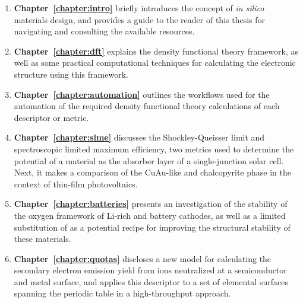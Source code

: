 \begin{enumerate}[]

\vfill
\item \textbf{Chapter~\ref{chapter:intro}} briefly introduces the concept of \textit{in silico} materials design, and provides a guide to the reader of this thesis for navigating and consulting the available resources.

\vfill
\item \textbf{Chapter~\ref{chapter:dft}} explains the density functional theory framework, as well as some practical computational techniques for calculating the electronic structure using this framework.

\vfill
\item \textbf{Chapter~\ref{chapter:automation}} outlines the workflows used for the automation of the required density functional theory calculations of each descriptor or metric.

\vfill
\item \textbf{Chapter~\ref{chapter:slme}} discusses the Shockley-Queisser limit and spectroscopic limited maximum efficiency, two metrics used to determine the potential of a material as the absorber layer of a single-junction solar cell. Next, it makes a comparison of the CuAu-like and chalcopyrite phase in the context of thin-film photovoltaics.

\vfill
\item \textbf{Chapter~\ref{chapter:batteries}} presents an investigation of the stability of the oxygen framework of Li-rich  and  battery cathodes, as well as a limited substitution of  as a potential recipe for improving the structural stability of these materials.

\vfill
\item \textbf{Chapter~\ref{chapter:quotas}} discloses a new model for calculating the secondary electron emission yield from ions neutralized at a semiconductor and metal surface, and applies this descriptor to a set of elemental surfaces spanning the periodic table in a high-throughput approach.


\end{enumerate}





\afterpage{\null\newpage}